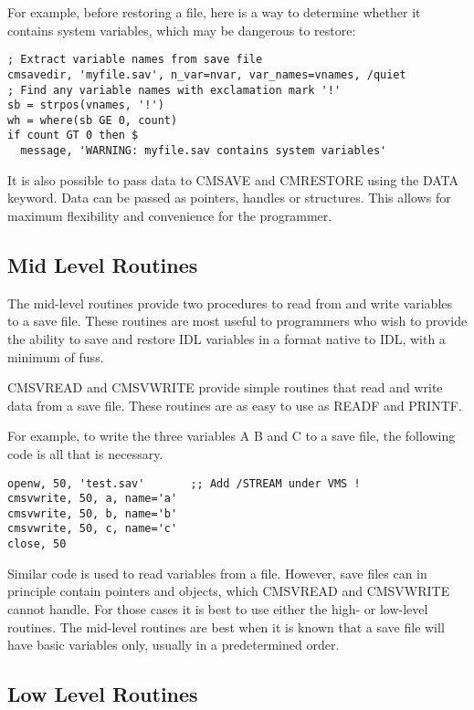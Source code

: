 \documentclass[12pt]{article}
\begin{document}
For example, before restoring a file, here is a way to determine
whether it contains system variables, which may be dangerous to
restore:

\begin{verbatim}
; Extract variable names from save file
cmsavedir, 'myfile.sav', n_var=nvar, var_names=vnames, /quiet
; Find any variable names with exclamation mark '!'
sb = strpos(vnames, '!')
wh = where(sb GE 0, count)
if count GT 0 then $
  message, 'WARNING: myfile.sav contains system variables'
\end{verbatim}

It is also possible to pass data to CMSAVE and CMRESTORE using the
DATA keyword.  Data can be passed as pointers, handles or structures.
This allows for maximum flexibility and convenience for the
programmer.

\subsection{Mid Level Routines\label{s::midlev}}

The mid-level routines provide two procedures to read from and write
variables to a save file.  These routines are most useful to
programmers who wish to provide the ability to save and restore IDL
variables in a format native to IDL, with a minimum of fuss.

CMSVREAD and CMSVWRITE provide simple routines that read and write
data from a save file.  These routines are as easy to use as READF and
PRINTF.

For example, to write the three variables A B and C to a save file,
the following code is all that is necessary.

\begin{verbatim}
openw, 50, 'test.sav'       ;; Add /STREAM under VMS !
cmsvwrite, 50, a, name='a'
cmsvwrite, 50, b, name='b'
cmsvwrite, 50, c, name='c'
close, 50
\end{verbatim}

Similar code is used to read variables from a file.  However, save
files can in principle contain pointers and objects, which CMSVREAD
and CMSVWRITE cannot handle.  For those cases it is best to use either
the high- or low-level routines.  The mid-level routines are best when
it is known that a save file will have basic variables only, usually
in a predetermined order.

\subsection{Low Level Routines\label{s::lowlev}}
\end{document}
